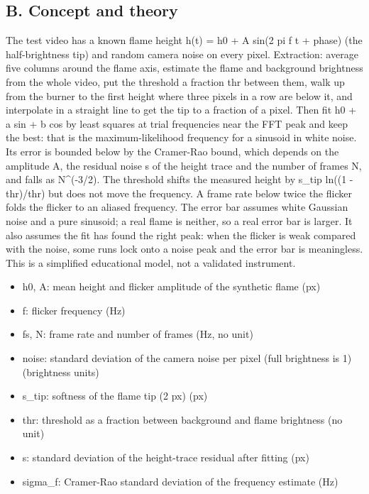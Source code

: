 \documentclass[11pt,a4paper]{article}
\begin{document}
\subsection*{B. Concept and theory}
The test video has a known flame height h(t) = h0 + A sin(2 pi f t + phase) (the half-brightness tip) and random camera noise on every pixel. Extraction: average five columns around the flame axis, estimate the flame and background brightness from the whole video, put the threshold a fraction thr between them, walk up from the burner to the first height where three pixels in a row are below it, and interpolate in a straight line to get the tip to a fraction of a pixel. Then fit h0 + a sin + b cos by least squares at trial frequencies near the FFT peak and keep the best: that is the maximum-likelihood frequency for a sinusoid in white noise. Its error is bounded below by the Cramer-Rao bound, which depends on the amplitude A, the residual noise s of the height trace and the number of frames N, and falls as N\textasciicircum{}(-3/2). The threshold shifts the measured height by s\_tip ln((1 - thr)/thr) but does not move the frequency. A frame rate below twice the flicker folds the flicker to an aliased frequency. The error bar assumes white Gaussian noise and a pure sinusoid; a real flame is neither, so a real error bar is larger. It also assumes the fit has found the right peak: when the flicker is weak compared with the noise, some runs lock onto a noise peak and the error bar is meaningless. This is a simplified educational model, not a validated instrument.

\begin{itemize}[nosep]
\item h0, A: mean height and flicker amplitude of the synthetic flame (px)
\item f: flicker frequency (Hz)
\item fs, N: frame rate and number of frames (Hz, no unit)
\item noise: standard deviation of the camera noise per pixel (full brightness is 1) (brightness units)
\item s\_tip: softness of the flame tip (2 px) (px)
\item thr: threshold as a fraction between background and flame brightness (no unit)
\item s: standard deviation of the height-trace residual after fitting (px)
\item sigma\_f: Cramer-Rao standard deviation of the frequency estimate (Hz)
\end{itemize}
\end{document}
